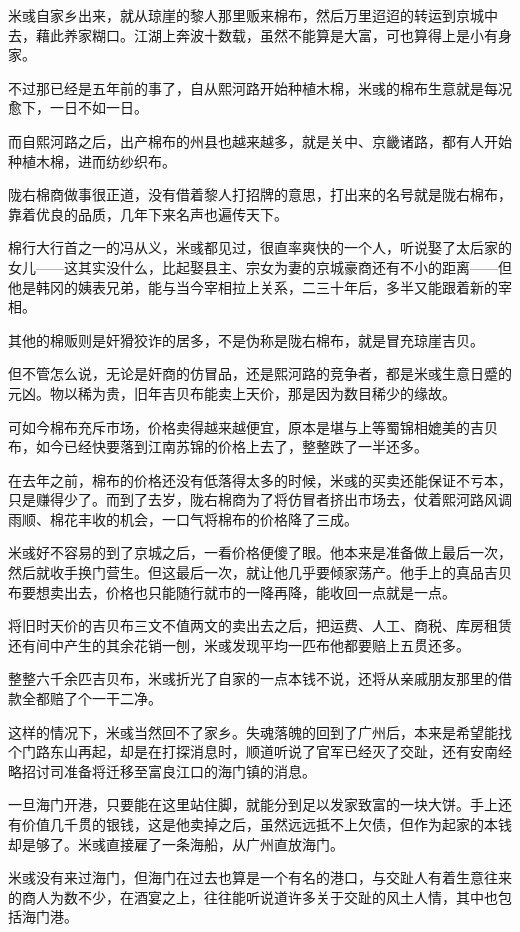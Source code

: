 米彧自家乡出来，就从琼崖的黎人那里贩来棉布，然后万里迢迢的转运到京城中去，藉此养家糊口。江湖上奔波十数载，虽然不能算是大富，可也算得上是小有身家。

不过那已经是五年前的事了，自从熙河路开始种植木棉，米彧的棉布生意就是每况愈下，一日不如一日。

而自熙河路之后，出产棉布的州县也越来越多，就是关中、京畿诸路，都有人开始种植木棉，进而纺纱织布。

陇右棉商做事很正道，没有借着黎人打招牌的意思，打出来的名号就是陇右棉布，靠着优良的品质，几年下来名声也遍传天下。

棉行大行首之一的冯从义，米彧都见过，很直率爽快的一个人，听说娶了太后家的女儿——这其实没什么，比起娶县主、宗女为妻的京城豪商还有不小的距离——但他是韩冈的姨表兄弟，能与当今宰相拉上关系，二三十年后，多半又能跟着新的宰相。

其他的棉贩则是奸猾狡诈的居多，不是伪称是陇右棉布，就是冒充琼崖吉贝。

但不管怎么说，无论是奸商的仿冒品，还是熙河路的竞争者，都是米彧生意日蹙的元凶。物以稀为贵，旧年吉贝布能卖上天价，那是因为数目稀少的缘故。

可如今棉布充斥市场，价格卖得越来越便宜，原本是堪与上等蜀锦相媲美的吉贝布，如今已经快要落到江南苏锦的价格上去了，整整跌了一半还多。

在去年之前，棉布的价格还没有低落得太多的时候，米彧的买卖还能保证不亏本，只是赚得少了。而到了去岁，陇右棉商为了将仿冒者挤出市场去，仗着熙河路风调雨顺、棉花丰收的机会，一口气将棉布的价格降了三成。

米彧好不容易的到了京城之后，一看价格便傻了眼。他本来是准备做上最后一次，然后就收手换门营生。但这最后一次，就让他几乎要倾家荡产。他手上的真品吉贝布要想卖出去，价格也只能随行就市的一降再降，能收回一点就是一点。

将旧时天价的吉贝布三文不值两文的卖出去之后，把运费、人工、商税、库房租赁还有间中产生的其余花销一刨，米彧发现平均一匹布他都要赔上五贯还多。

整整六千余匹吉贝布，米彧折光了自家的一点本钱不说，还将从亲戚朋友那里的借款全都赔了个一干二净。

这样的情况下，米彧当然回不了家乡。失魂落魄的回到了广州后，本来是希望能找个门路东山再起，却是在打探消息时，顺道听说了官军已经灭了交趾，还有安南经略招讨司准备将迁移至富良江口的海门镇的消息。

一旦海门开港，只要能在这里站住脚，就能分到足以发家致富的一块大饼。手上还有价值几千贯的银钱，这是他卖掉之后，虽然远远抵不上欠债，但作为起家的本钱却是够了。米彧直接雇了一条海船，从广州直放海门。

米彧没有来过海门，但海门在过去也算是一个有名的港口，与交趾人有着生意往来的商人为数不少，在酒宴之上，往往能听说道许多关于交趾的风土人情，其中也包括海门港。

